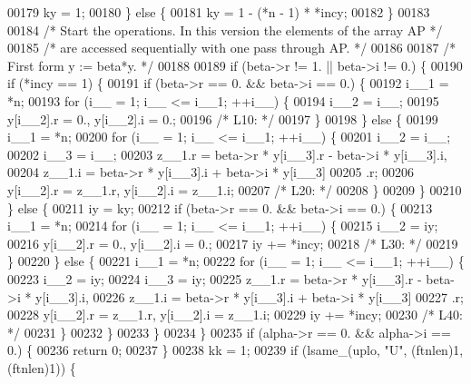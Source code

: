 \begin{DoxyCode}
00179     ky = 1;
00180     \} \textcolor{keywordflow}{else} \{
00181     ky = 1 - (*n - 1) * *incy;
00182     \}
00183 
00184 \textcolor{comment}{/*     Start the operations. In this version the elements of the array AP */}
00185 \textcolor{comment}{/*     are accessed sequentially with one pass through AP. */}
00186 
00187 \textcolor{comment}{/*     First form  y := beta*y. */}
00188 
00189     \textcolor{keywordflow}{if} (beta->r != 1. || beta->i != 0.) \{
00190     \textcolor{keywordflow}{if} (*incy == 1) \{
00191         \textcolor{keywordflow}{if} (beta->r == 0. && beta->i == 0.) \{
00192         i\_\_1 = *n;
00193         \textcolor{keywordflow}{for} (i\_\_ = 1; i\_\_ <= i\_\_1; ++i\_\_) \{
00194             i\_\_2 = i\_\_;
00195             y[i\_\_2].r = 0., y[i\_\_2].i = 0.;
00196 \textcolor{comment}{/* L10: */}
00197         \}
00198         \} \textcolor{keywordflow}{else} \{
00199         i\_\_1 = *n;
00200         \textcolor{keywordflow}{for} (i\_\_ = 1; i\_\_ <= i\_\_1; ++i\_\_) \{
00201             i\_\_2 = i\_\_;
00202             i\_\_3 = i\_\_;
00203             z\_\_1.r = beta->r * y[i\_\_3].r - beta->i * y[i\_\_3].i, 
00204                 z\_\_1.i = beta->r * y[i\_\_3].i + beta->i * y[i\_\_3]
00205                 .r;
00206             y[i\_\_2].r = z\_\_1.r, y[i\_\_2].i = z\_\_1.i;
00207 \textcolor{comment}{/* L20: */}
00208         \}
00209         \}
00210     \} \textcolor{keywordflow}{else} \{
00211         iy = ky;
00212         \textcolor{keywordflow}{if} (beta->r == 0. && beta->i == 0.) \{
00213         i\_\_1 = *n;
00214         \textcolor{keywordflow}{for} (i\_\_ = 1; i\_\_ <= i\_\_1; ++i\_\_) \{
00215             i\_\_2 = iy;
00216             y[i\_\_2].r = 0., y[i\_\_2].i = 0.;
00217             iy += *incy;
00218 \textcolor{comment}{/* L30: */}
00219         \}
00220         \} \textcolor{keywordflow}{else} \{
00221         i\_\_1 = *n;
00222         \textcolor{keywordflow}{for} (i\_\_ = 1; i\_\_ <= i\_\_1; ++i\_\_) \{
00223             i\_\_2 = iy;
00224             i\_\_3 = iy;
00225             z\_\_1.r = beta->r * y[i\_\_3].r - beta->i * y[i\_\_3].i, 
00226                 z\_\_1.i = beta->r * y[i\_\_3].i + beta->i * y[i\_\_3]
00227                 .r;
00228             y[i\_\_2].r = z\_\_1.r, y[i\_\_2].i = z\_\_1.i;
00229             iy += *incy;
00230 \textcolor{comment}{/* L40: */}
00231         \}
00232         \}
00233     \}
00234     \}
00235     \textcolor{keywordflow}{if} (alpha->r == 0. && alpha->i == 0.) \{
00236     \textcolor{keywordflow}{return} 0;
00237     \}
00238     kk = 1;
00239     \textcolor{keywordflow}{if} (lsame\_(uplo, \textcolor{stringliteral}{"U"}, (ftnlen)1, (ftnlen)1)) \{

\end{DoxyCode}
